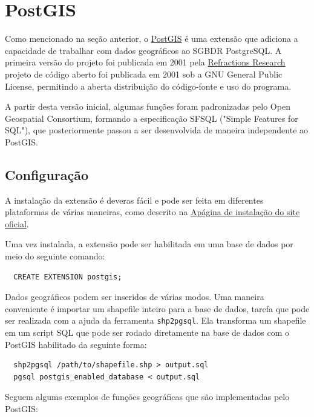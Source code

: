 \documentclass[12pt]{article}
\begin{document}
\section{PostGIS} \label{sec:firstpage}

Como mencionado na seção anterior, o \href{http://postgis.net}{PostGIS} é uma
extensão que adiciona a capacidade de trabalhar com dados geográficos ao SGBDR
PostgreSQL. A primeira versão do projeto foi publicada em 2001 pela
\href{http://refractions.net}{Refractions Research} projeto de código aberto
foi publicada em 2001 sob a GNU General Public License, permitindo a aberta
distribuição do código-fonte e uso do programa.

A partir desta versão inicial, algumas funções foram padronizadas pelo Open
Geospatial Consortium, formando a especificação SFSQL ("Simple Features for
SQL"), que posteriormente passou a ser desenvolvida de maneira independente ao
PostGIS.

\subsection{Configuração}

A instalação da extensão é deveras fácil e pode ser feita em diferentes
plataformas de várias maneiras, como descrito na
\href{http://postgis.net/install}{Apágina de instalação do site oficial}.

Uma vez instalada, a extensão pode ser habilitada em uma base de dados por meio
do seguinte comando:

\begin{verbatim}
  CREATE EXTENSION postgis;
\end{verbatim}

Dados geográficos podem ser inseridos de várias modos. Uma maneira conveniente
é importar um shapefile inteiro para a base de dados, tarefa que pode ser
realizada com a ajuda da ferramenta \texttt{shp2pgsql}. Ela transforma um
shapefile em um script SQL que pode ser rodado diretamente na base de dados com
o PostGIS habilitado da seguinte forma:

\begin{verbatim}
  shp2pgsql /path/to/shapefile.shp > output.sql
  pgsql postgis_enabled_database < output.sql
\end{verbatim}

Seguem algums exemplos de funções geográficas que são implementadas pelo
PostGIS:
\end{document}

